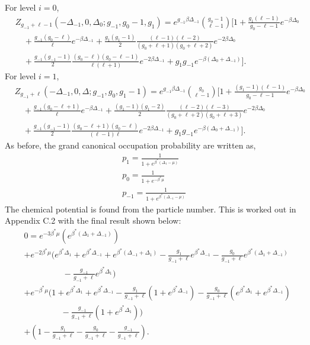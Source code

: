 For level $i=0$,
\begin{align}
    &Z_{g_{-1}+\ell-1}(-\Delta_{-1},0,\Delta_0;g_{-1},g_0-1,g_1)=e^{g_{-1}\beta\Delta_{-1}} {g_0-1\choose \ell-1} \Biggr[1+\frac{g_1 (\ell-1)}{g_0-\ell-1} e^{-\beta\Delta_0}\nonumber\\
    &\quad+\frac{g_{-1}(g_0-\ell)}{\ell} e^{-\beta\Delta_{-1}} +\frac{g_1(g_1-1)}{2} \frac{(\ell-1)(\ell-2)}{(g_0+\ell+1)(g_0+\ell+2)}e^{-2\beta\Delta_0}\nonumber\\ &\quad+\frac{g_{-1}(g_{-1}-1)}{2} \frac{(g_0-\ell)(g_0-\ell-1)}{\ell(\ell+1)} e^{-2\beta\Delta_{-1}} +g_1g_{-1}e^{-\beta(\Delta_0+\Delta_{-1})}\Biggr].
\end{align}
For level $i=1$,
\begin{align}
    &Z_{g_{-1}+\ell}(-\Delta_{-1},0,\Delta;g_{-1},g_0,g_1-1) =e^{g_{-1}\beta\Delta_{-1}} {g_0\choose \ell-1} \Biggr[1+\frac{(g_1-1) (\ell-1)}{g_0-\ell-1} e^{-\beta\Delta_0} \nonumber\\
    &\quad+\frac{g_{-1}(g_0-\ell+1)}{\ell} e^{-\beta\Delta_{-1}} +\frac{(g_1-1)(g_1-2)}{2} \frac{(\ell-2)(\ell-3)}{(g_0+\ell+2)(g_0+\ell+3)}e^{-2\beta\Delta_0}\nonumber\\ &\quad+\frac{g_{-1}(g_{-1}-1)}{2} \frac{(g_0-\ell+1)(g_0-\ell)}{(\ell-1)\ell} e^{-2\beta\Delta_{-1}} +g_1g_{-1}e^{-\beta(\Delta_0+\Delta_{-1})}\Biggr].
\end{align}
As before, the grand canonical occupation probability are written as,
\begin{gather}
    p_1=\frac{1}{1+e^{\beta^*(\Delta_1-\mu)}}\nonumber\\
    p_0=\frac{1}{1+e^{-\beta^*\mu}}\nonumber\\
    p_{-1}=\frac{1}{1+e^{\beta^*(\Delta_{-1}-\mu)}}\nonumber
\end{gather}
The chemical potential is found from the particle number. This is worked out in Appendix C.2 with the final result shown below:
\begin{align}
    &0=e^{-3\beta^*\mu}(e^{\beta^*(\Delta_1+\Delta_{-1})})\nonumber\\
    &+e^{-2\beta^*\mu}\Biggr(e^{\beta^*\Delta_1}+e^{\beta^*\Delta_{-1}}+e^{\beta^*(\Delta_{-1}+\Delta_1)}-\frac{g_1}{g_{-1}+\ell}e^{\beta^*\Delta_{-1}}\nonumber-\frac{g_0}{g_{-1}+\ell}e^{\beta^*(\Delta_1+\Delta_{-1})}\nonumber\\
    &\quad\quad\quad\quad\ \ \ -\frac{g_{-1}}{g_{-1}+\ell}e^{\beta^*\Delta_1}\Biggr)\nonumber\\
    &+e^{-\beta^*\mu}\Biggr(1+e^{\beta^*\Delta_1}+e^{\beta^*\Delta_{-1}}-\frac{g_1}{g_{-1}+\ell}(1+e^{\beta^*\Delta_{-1}})-\frac{g_0}{g_{-1}+\ell}(e^{\beta^*\Delta_1}+e^{\beta^*\Delta_{-1}})\nonumber\\
    &\quad\quad\quad\quad\ \ -\frac{g_{-1}}{g_{-1}+\ell}(1+e^{\beta^*\Delta_1})\Biggr)\nonumber\\
    & +(1-\frac{g_1}{g_{-1}+\ell}-\frac{g_0}{g_{-1}+\ell}-\frac{g_{-1}}{g_{-1}+\ell}).
\end{align}
